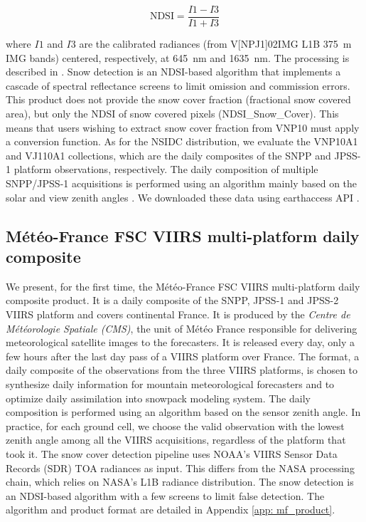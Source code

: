 \documentclass[tc, manuscript]{copernicus}
\begin{document}
\begin{equation}
    \mathrm{NDSI} = \frac{I1-I3}{I1+I3}
    \label{eq: ndsi}
\end{equation}

where $I1$ and $I3$ are the calibrated radiances (from V[NP\textbar J1]02IMG L1B 375~m IMG bands) centered, respectively, at 645~nm and 1635~nm. The processing is described in \citep{riggs2023viirs}. Snow detection is an NDSI-based algorithm that implements a cascade of spectral reflectance screens to limit omission and commission errors. %
This product does not provide the snow cover fraction (fractional snow covered area), but only the NDSI of snow covered pixels (NDSI\_Snow\_Cover). This means that users wishing to extract snow cover fraction from VNP10 must apply a conversion function. As for the NSIDC distribution, we evaluate the VNP10A1 and VJ110A1 collections, which are the daily composites of the SNPP and JPSS-1 platform observations, respectively. The daily composition of multiple SNPP/JPSS-1 acquisitions is performed using an algorithm mainly based on the solar and view zenith angles \citep{riggs2023viirs}. We downloaded these data using earthaccess API \citep{barrett_2026_18435881}.

\subsection{Météo-France FSC VIIRS multi-platform daily composite}
\label{subsec: data_meteofrance}
We present, for the first time, the Météo-France FSC VIIRS multi-platform daily composite product. It is a daily composite of the SNPP, JPSS-1 and JPSS-2 VIIRS platform and covers continental France. It is produced by the
\textit{Centre de Météorologie Spatiale (CMS)}, the unit of Météo France responsible for delivering meteorological satellite images to the forecasters. It is released every day, only a few hours after the last day pass of a VIIRS platform over France. The format, a daily composite of the observations from the three VIIRS platforms, is chosen to synthesize daily information for mountain meteorological forecasters and to optimize daily assimilation into snowpack modeling system. The daily composition is performed using an algorithm based on the sensor zenith angle. In practice, for each ground cell, we choose the valid observation with the lowest zenith angle among all the VIIRS acquisitions, regardless of the platform that took it. The snow cover detection pipeline uses NOAA's VIIRS Sensor Data Records (SDR) TOA radiances as input. This differs from the NASA processing chain, which relies on NASA's L1B radiance distribution. The snow detection is an NDSI-based algorithm with a few screens to limit false detection. The algorithm and product format are detailed in Appendix \ref{app: mf_product}. 
\end{document}
